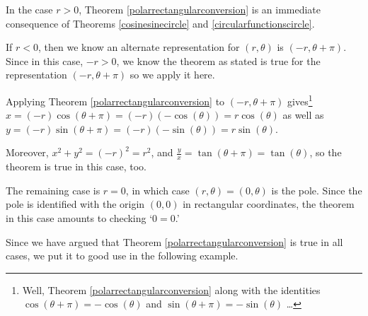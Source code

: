 \documentclass{ximera}
\begin{document}

 

In the case $r > 0$, Theorem \ref{polarrectangularconversion} is an immediate consequence of Theorems \ref{cosinesinecircle} and \ref{circularfunctionscircle}.

 

If $r < 0$, then we know an alternate representation for $(r,\theta)$ is $(-r, \theta + \pi)$.  Since in this case, $-r>0$, we know the theorem as stated is true for the representation $(-r, \theta + \pi)$ so we apply it here.

 

Applying Theorem \ref{polarrectangularconversion}  to $(-r,\theta+\pi)$ gives\footnote{Well,  Theorem \ref{polarrectangularconversion} along with the identities $\cos(\theta + \pi) = -\cos(\theta)$ and $\sin(\theta + \pi) = -\sin(\theta)$ \ldots}  $x = (-r) \cos(\theta + \pi) = (-r)(-\cos(\theta)) = r\cos(\theta)$  as well as  $y = (-r) \sin(\theta + \pi) = (-r)(-\sin(\theta)) = r\sin(\theta)$. 

 

Moreover, $x^2 + y^2 = (-r)^2 = r^2$, and $\frac{y}{x} = \tan(\theta + \pi) = \tan(\theta)$, so the theorem is true in this case, too.  

 

The remaining case is $r = 0$, in which case $(r,\theta) = (0,\theta)$ is the pole.  Since the pole is identified with the origin $(0,0)$ in rectangular coordinates, the theorem in this case amounts to checking `$0=0$.'  

 

Since we have argued that  Theorem \ref{polarrectangularconversion} is true in all cases, we put it to good use in the following example.

 
\end{document}
